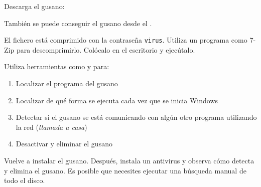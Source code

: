 \begin{homeworkProblem}
  Descarga el gusano:

  \begin{center}
    \begin{minipage}{.8\textwidth}
      \begin{center}
      \end{center}
    \end{minipage}
  \end{center}

  También se puede conseguir el gusano desde el .

  

  El fichero está comprimido con la contraseña \texttt{virus}. Utiliza un programa como 7-Zip para descomprimirlo. Colócalo en el escritorio y ejecútalo.
\end{homeworkProblem}

\begin{homeworkProblem}
  Utiliza herramientas como  y  para:
  \begin{enumerate}
  \item Localizar el programa del gusano
  \item Localizar de qué forma se ejecuta cada vez que se inicia Windows
  \item Detectar si el gusano se está comunicando con algún otro programa utilizando la red (\textit{llamada a casa})
  \item Desactivar y eliminar el gusano
  \end{enumerate}

\end{homeworkProblem}


\begin{homeworkProblem}
  Vuelve a instalar el gusano. Después, instala un antivirus y observa cómo detecta y elimina el gusano. Es posible que necesites ejecutar una búsqueda manual de todo el disco.
\end{homeworkProblem}

